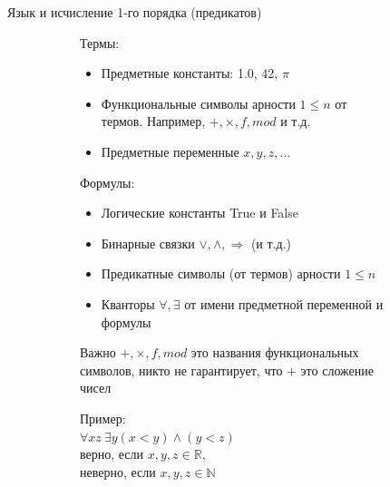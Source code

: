 \begin{frame}{Язык и исчисление 1-го порядка (предикатов)}
\begin{figure}[t]
  \begin{subfigure}[t]{0.5\textwidth}
    Термы:
    \begin{itemize}
      \item Предметные константы: 1.0, 42, $\pi$
      \item Функциональные символы арности  $1\leqslant n$ от термов. Например, $+, \times, f, mod$ и т.д.
	  \item Предметные переменные $x,y,z,\dots$
    \end{itemize}
    Формулы:
    \begin{itemize}
  \item Логические константы True и False
  \item Бинарные связки $\vee, \wedge, \Rightarrow$ (и т.д.) %
  \item Предикатные символы (от термов) арности $1\leqslant n$
  \item Кванторы $\forall, \exists$ от имени предметной переменной и формулы
    \end{itemize}
  \end{subfigure}
\hspace{0.05\textwidth}
  \begin{subfigure}[t]{0.4\textwidth}
    \begin{block}{Важно}
      $+, \times, f, mod$ это названия функциональных символов, никто не гарантирует, что  $+$ это сложение чисел
    \end{block}
\vspace{1em}
Пример: \\
$\forall x z\ \exists y (x < y) \wedge (y < z)$\\
верно, если $x,y,z \in \mathbb{R}$, \\
неверно, если $x,y,z \in \mathbb{N}$
  \end{subfigure}
\end{figure}
\end{frame}

